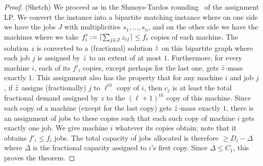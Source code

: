 	\begin{proof} (Sketch) We proceed as in  the Shmoys-Tardos rounding~\cite{ShmoysT93} of the assignment LP.
	We convert the instance into a bipartite matching instance where on one side we have the jobs $J$ with
		multiplicities $s_1,\ldots,s_n$, and on the other side we have the machines where we take $f'_i := \lceil\sum_{j\in J} z_{ij}\rceil \le f_i$ copies of each machine.
		The solution $z$ is converted to a (fractional) solution $\bar{z}$ on this bipartite graph where each job $j$
		is assigned  by $\bar{z}$ to an extent of at most $1$. Furthermore, for every machine $i$, each of its $f'_i$ copies, except perhaps for the last one,
		 gets $\bar{z}$-mass exactly $1$.  This assignment also has the property that for any machine $i$ and job $j$,
		if  $\bar{z}$ assigns (fractionally) $j$ to $\ell^{th}$ copy of $i$, then $c_j$ is at least the total fractional demand assigned by $z$ to
		the $(\ell+1)^{th}$ copy of this machine.
		Since each copy of a machine (except for the last copy) gets $\bar{z}$-mass exactly $1$, there is an assignment of jobs to these copies such that each such copy of machine $i$ gets exactly one job. We give machine $i$ whatever its copies obtain; note that it obtains $f'_i \leq f_i$ jobs.
		The total capacity of jobs allocated is therefore $\ge D_i - \Delta$ where $\Delta$ is the fractional capacity assigned to $i$'s first copy. Since $\Delta\leq C_1$,  this proves the theorem.
%		
%	
%		
	\end{proof}
	

